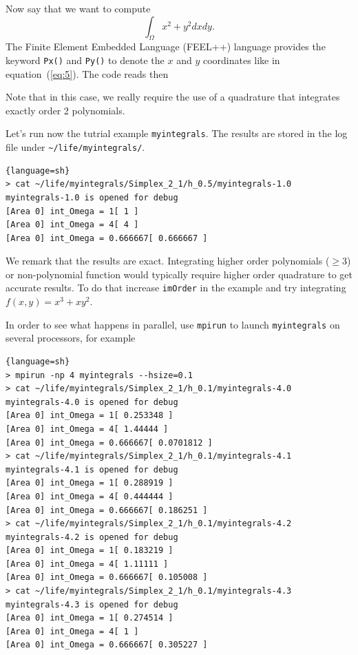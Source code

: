 \documentclass[11pt]{article}
\begin{document}
Now say that we want to compute
\begin{equation}
  \label{eq:5}
  \int_\Omega x^2 + y^2 dx dy.
\end{equation}
The Finite Element Embedded Language (FEEL++) language provides the
keyword \lstinline!Px()! and \lstinline!Py()! to denote the $x$ and
$y$ coordinates like in equation~(\ref{eq:5}).  The code reads then




Note that in this case, we really require the use of a quadrature that
integrates exactly order 2 polynomials.

Let's run now the tutrial example \lstinline!myintegrals!. The results are stored
in the log file under \lstinline!~/life/myintegrals/!.

\begin{lstlisting}{language=sh}
> cat ~/life/myintegrals/Simplex_2_1/h_0.5/myintegrals-1.0
myintegrals-1.0 is opened for debug
[Area 0] int_Omega = 1[ 1 ]
[Area 0] int_Omega = 4[ 4 ]
[Area 0] int_Omega = 0.666667[ 0.666667 ]
\end{lstlisting}

We remark that the results are exact. Integrating higher order
polynomials ($\geq 3$) or non-polynomial function would typically
require higher order quadrature to get accurate results. To do that
increase \lstinline!imOrder! in the example and try integrating
$f(x,y)=x^3 + x y^2$.


In order to see what happens in parallel, use \lstinline!mpirun! to
launch \lstinline!myintegrals! on several processors, for example

\begin{lstlisting}{language=sh}
> mpirun -np 4 myintegrals --hsize=0.1
> cat ~/life/myintegrals/Simplex_2_1/h_0.1/myintegrals-4.0
myintegrals-4.0 is opened for debug
[Area 0] int_Omega = 1[ 0.253348 ]
[Area 0] int_Omega = 4[ 1.44444 ]
[Area 0] int_Omega = 0.666667[ 0.0701812 ]
> cat ~/life/myintegrals/Simplex_2_1/h_0.1/myintegrals-4.1
myintegrals-4.1 is opened for debug
[Area 0] int_Omega = 1[ 0.288919 ]
[Area 0] int_Omega = 4[ 0.444444 ]
[Area 0] int_Omega = 0.666667[ 0.186251 ]
> cat ~/life/myintegrals/Simplex_2_1/h_0.1/myintegrals-4.2
myintegrals-4.2 is opened for debug
[Area 0] int_Omega = 1[ 0.183219 ]
[Area 0] int_Omega = 4[ 1.11111 ]
[Area 0] int_Omega = 0.666667[ 0.105008 ]
> cat ~/life/myintegrals/Simplex_2_1/h_0.1/myintegrals-4.3
myintegrals-4.3 is opened for debug
[Area 0] int_Omega = 1[ 0.274514 ]
[Area 0] int_Omega = 4[ 1 ]
[Area 0] int_Omega = 0.666667[ 0.305227 ]
\end{lstlisting}
\end{document}
